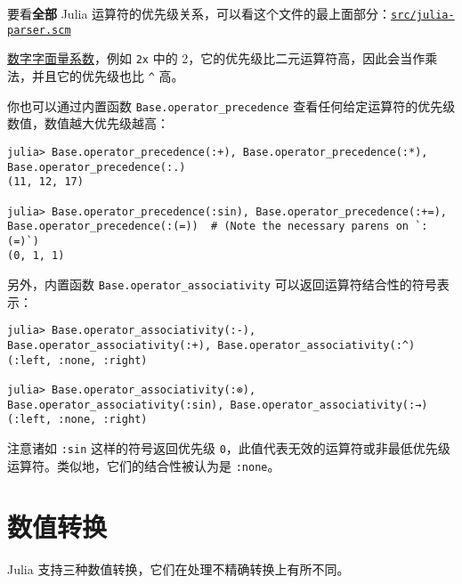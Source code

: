 要看\textbf{全部} Julia 运算符的优先级关系，可以看这个文件的最上面部分：\href{https://github.com/JuliaLang/julia/blob/master/src/julia-parser.scm}{\texttt{src/julia-parser.scm}}



\hyperlink{7285052708387693199}{数字字面量系数}，例如 \texttt{2x} 中的 2，它的优先级比二元运算符高，因此会当作乘法，并且它的优先级也比 \texttt{{\textasciicircum}} 高。



你也可以通过内置函数 \texttt{Base.operator\_precedence} 查看任何给定运算符的优先级数值，数值越大优先级越高：




\begin{verbatim}
julia> Base.operator_precedence(:+), Base.operator_precedence(:*), Base.operator_precedence(:.)
(11, 12, 17)

julia> Base.operator_precedence(:sin), Base.operator_precedence(:+=), Base.operator_precedence(:(=))  # (Note the necessary parens on `:(=)`)
(0, 1, 1)
\end{verbatim}



另外，内置函数 \texttt{Base.operator\_associativity} 可以返回运算符结合性的符号表示：




\begin{verbatim}
julia> Base.operator_associativity(:-), Base.operator_associativity(:+), Base.operator_associativity(:^)
(:left, :none, :right)

julia> Base.operator_associativity(:⊗), Base.operator_associativity(:sin), Base.operator_associativity(:→)
(:left, :none, :right)
\end{verbatim}



注意诸如 \texttt{:sin} 这样的符号返回优先级 \texttt{0}，此值代表无效的运算符或非最低优先级运算符。类似地，它们的结合性被认为是 \texttt{:none}。



\hypertarget{1678218620254251806}{}


\section{数值转换}



Julia 支持三种数值转换，它们在处理不精确转换上有所不同。



